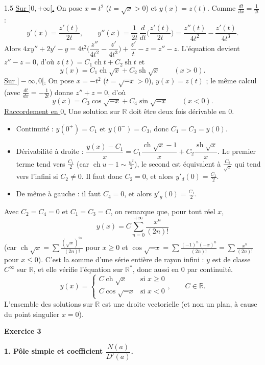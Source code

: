 \documentclass[12pt]{article}
\begin{document}
\begin{spacing}{1.5}
\underline{Sur $]0,+\infty[$.} On pose $x=t^2$ ($t=\sqrt x>0$) et $y(x)=z(t)$. Comme $\frac{dt}{dx}=\frac1{2t}$ :
\[
y'(x)=\frac{z'(t)}{2t},\qquad y''(x)=\frac{1}{2t}\,\frac{d}{dt}\Big(\frac{z'(t)}{2t}\Big)=\frac{z''(t)}{4t^2}-\frac{z'(t)}{4t^3}.
\]
Alors $4xy''+2y'-y=4t^2\Big(\dfrac{z''}{4t^2}-\dfrac{z'}{4t^3}\Big)+\dfrac{z'}{t}-z=z''-z$. L'équation devient $z''-z=0$, d'où $z(t)=C_1\operatorname{ch}t+C_2\operatorname{sh}t$ et
\[
y(x)=C_1\operatorname{ch}\sqrt x+C_2\operatorname{sh}\sqrt x\qquad(x>0).
\]
\underline{Sur $]-\infty,0[$.} On pose $x=-t^2$ ($t=\sqrt{-x}>0$), $y(x)=z(t)$ ; le même calcul (avec $\frac{dt}{dx}=-\frac1{2t}$) donne $z''+z=0$, d'où
\[
y(x)=C_3\cos\sqrt{-x}+C_4\sin\sqrt{-x}\qquad(x<0).
\]
\underline{Raccordement en $0$.} Une solution sur $\mathbb{R}$ doit être deux fois dérivable en $0$.
\begin{itemize}
\item Continuité : $y(0^+)=C_1$ et $y(0^-)=C_3$, donc $C_1=C_3=y(0)$.
\item Dérivabilité à droite : $\dfrac{y(x)-C_1}{x}=C_1\dfrac{\operatorname{ch}\sqrt x-1}{x}+C_2\dfrac{\operatorname{sh}\sqrt x}{x}$. Le premier terme tend vers $\frac{C_1}{2}$ (car $\operatorname{ch}u-1\sim\frac{u^2}{2}$), le second est équivalent à $\frac{C_2}{\sqrt x}$ qui tend vers l'infini si $C_2\neq0$. Il faut donc $C_2=0$, et alors $y'_d(0)=\frac{C_1}{2}$.
\item De même à gauche : il faut $C_4=0$, et alors $y'_g(0)=\frac{C_1}{2}$.
\end{itemize}
Avec $C_2=C_4=0$ et $C_1=C_3=C$, on remarque que, pour tout réel $x$,
\[
y(x)=C\sum_{n=0}^{+\infty}\frac{x^n}{(2n)!}
\]
(car $\operatorname{ch}\sqrt x=\sum\frac{(\sqrt x)^{2n}}{(2n)!}$ pour $x\ge0$ et $\cos\sqrt{-x}=\sum\frac{(-1)^n(-x)^n}{(2n)!}=\sum\frac{x^n}{(2n)!}$ pour $x\le0$). C'est la somme d'une série entière de rayon infini : $y$ est de classe $C^\infty$ sur $\mathbb{R}$, et elle vérifie l'équation sur $\mathbb{R}^*$, donc aussi en $0$ par continuité.
\[
\boxed{y(x)=\begin{cases}C\operatorname{ch}\sqrt x & \text{si } x\ge0\\ C\cos\sqrt{-x} & \text{si } x<0\end{cases},\qquad C\in\mathbb{R}}.
\]
L'ensemble des solutions sur $\mathbb{R}$ est une droite vectorielle (et non un plan, à cause du point singulier $x=0$).

\medskip\textbf{Exercice 3}

\textbf{1. Pôle simple et coefficient $\dfrac{N(a)}{D'(a)}$.}


\end{spacing}
\end{document}

